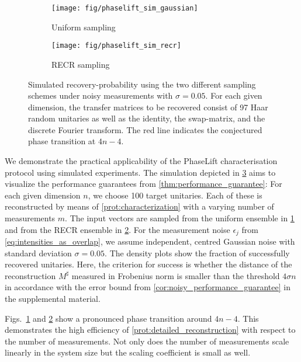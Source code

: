 \begin{figure}[tbp]
  \begin{subfigure}{.475\columnwidth}
    \texttt{[image: fig/phaselift\_sim\_gaussian]}
    \caption{\label{sfig:simplot.gaussian}%
      Uniform sampling
    }
   \end{subfigure}
  \begin{subfigure}{.475\columnwidth}
    \texttt{[image: fig/phaselift\_sim\_recr]}
    \caption{\label{sfig:simplot.recr}%
      RECR sampling
    }
   \end{subfigure}
  \caption{\label{fig:simplot}%
    Simulated recovery-probability using the two different sampling schemes under noisy measurements with $\sigma = 0.05$.
    For each given dimension, the transfer matrices to be recovered consist of 97 Haar random unitaries as well as the identity, the swap-matrix, and the discrete Fourier transform.
    The red line indicates the conjectured phase transition at $4 n - 4$.
  }
\end{figure}

We demonstrate the practical applicability of the PhaseLift characterisation protocol using simulated experiments.
The simulation depicted in \cref{fig:simplot} aims to visualize the performance guarantees from \cref{thm:performance_guarantee}:
For each given dimension $n$, we choose 100 target unitaries.
Each of these is reconstructed by means of \cref{prot:characterization} with a varying number of measurements $m$.
The input vectors are sampled from the uniform ensemble in \cref{sfig:simplot.gaussian} and from the RECR ensemble in \cref{sfig:simplot.recr}.
For the measurement noise $\epsilon_j$ from \cref{eq:intensities_as_overlap}, we assume independent, centred Gaussian noise with standard deviation $\sigma = 0.05$.
The density plots show the fraction of successfully recovered unitaries.
Here, the criterion for success is whether the distance of the reconstruction $M^\sharp$ measured in Frobenius norm is smaller than the threshold  $4 \sigma n$ in accordance with the error bound from \cref{cor:noisy_performance_guarantee} in the supplemental material.

Figs.~\ref{sfig:simplot.gaussian} and \ref{sfig:simplot.recr} show a pronounced phase transition around $4n - 4$.
This demonstrates the high efficiency of \cref{prot:detailed_reconstruction} with respect to the number of measurements.
Not only does the number of measurements scale linearly in the system size but the scaling coefficient is small as well.



